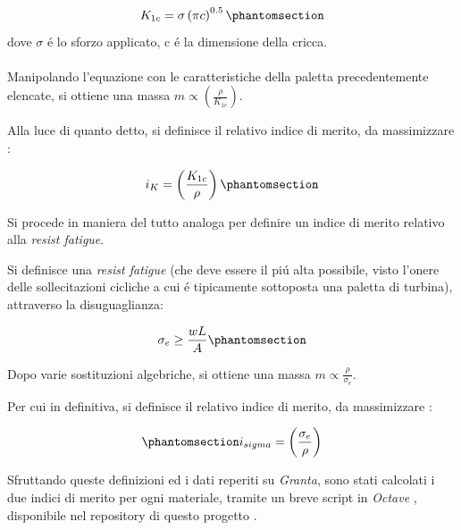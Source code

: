 \documentclass{article}
\begin{document}
        \begin{equation}
            K_{1c} = \sigma\left(\pi c\right)^{0.5} 
            \phantomsection \label{equation:frac_tough}
        \end{equation}
        dove $\sigma$ é lo sforzo applicato, c é la dimensione della cricca. \\ \\ 

        Manipolando l'equazione con le caratteristiche della paletta precedentemente
        elencate, si ottiene una massa $m \propto \left(\frac{\rho}{K_{1c}}\right) $.

        Alla luce di quanto detto, si definisce il relativo indice di merito, da massimizzare \autocite{SciencePubGroup}:

        \begin{equation}
            i_{K} = \left (\frac{K_{1c}}{\rho}\right)
            \phantomsection \label{equation:index_frac_tough}
        \end{equation}
        \clearpage 

        Si procede in maniera del tutto analoga per definire un indice di merito relativo alla 
        \textit{resist fatigue}.

        Si definisce una \textit{resist fatigue} (che deve essere il piú alta possibile,
        visto l'onere delle sollecitazioni cicliche a cui é tipicamente sottoposta una paletta di turbina), 
        attraverso la disuguaglianza:

        \begin{equation}
            \sigma_e \geq \frac{wL}{A}
            \phantomsection \label{equation:resist_fatigue}
        \end{equation}

        Dopo varie sostituzioni algebriche, si ottiene una massa $m \propto \frac{\rho}{\sigma_e}$.

        Per cui in definitiva, si definisce il relativo indice di merito, da massimizzare \autocite{SciencePubGroup}:

        \begin{equation}
            \phantomsection \label{equation:resist_fatigue_index}
            i_{sigma} = \left (\frac{\sigma_e}{\rho}\right)
        \end{equation}

        Sfruttando queste definizioni ed i dati reperiti su \textit{Granta}, 
        sono stati calcolati i due indici di merito per ogni materiale, tramite un breve script in 
        \textit{Octave} \autocite{Octave}, disponibile nel repository di questo progetto \autocite{Relazione_materiali}. \\ 
\end{document}
